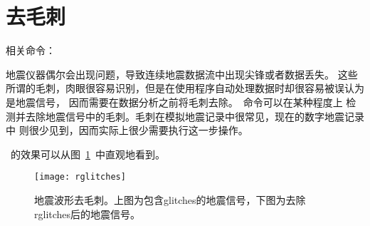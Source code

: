 \section{去毛刺}
相关命令：

地震仪器偶尔会出现问题，导致连续地震数据流中出现尖锋或者数据丢失。
这些所谓的毛刺，肉眼很容易识别，但是在使用程序自动处理数据时却很容易被误认为是地震信号，
因而需要在数据分析之前将毛刺去除。~命令可以在某种程度上
检测并去除地震信号中的毛刺。毛刺在模拟地震记录中很常见，现在的数字地震记录中
则很少见到，因而实际上很少需要执行这一步操作。

~的效果可以从图~\ref{fig:deglitches}~中直观地看到。
\begin{figure}[H]
\centering
\texttt{[image: rglitches]}
\caption[地震波形去毛刺]{地震波形去毛刺。上图为包含glitches的地震信号，下图为去除
rglitches后的地震信号。}
\label{fig:deglitches}
\end{figure}
